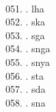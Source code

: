 \begin{tabbing}
\egroup  \\
051.	. 	\> lha 	\> \bgroup\tibetan \def\u#1{\vtop{\baselineskip0pt\hbox{#1}\hbox{\tibsp\char123}}}\parindent=0pt \newbox\fillerbox\setbox\fillerbox\hbox{\vrule height0.4cm depth0.4cm width0pt}\def\filler{\copy\fillerbox}\filler\tibsp{}\tenrm\ \tibetan
\egroup  \\
052.	. 	\> ska 	\> \bgroup\tibetan \def\u#1{\vtop{\baselineskip0pt\hbox{#1}\hbox{\tibsp\char123}}}\parindent=0pt \newbox\fillerbox\setbox\fillerbox\hbox{\vrule height0.4cm depth0.4cm width0pt}\def\filler{\copy\fillerbox}\filler\tibsp{}\tenrm\ \tibetan
\egroup  \\
053.	. 	\> sga 	\> \bgroup\tibetan \def\u#1{\vtop{\baselineskip0pt\hbox{#1}\hbox{\tibsp\char123}}}\parindent=0pt \newbox\fillerbox\setbox\fillerbox\hbox{\vrule height0.4cm depth0.4cm width0pt}\def\filler{\copy\fillerbox}\filler\tibsp{}\tenrm\ \tibetan
\egroup  \\
054.	. 	\> snga 	\> \bgroup\tibetan \def\u#1{\vtop{\baselineskip0pt\hbox{#1}\hbox{\tibsp\char123}}}\parindent=0pt \newbox\fillerbox\setbox\fillerbox\hbox{\vrule height0.4cm depth0.4cm width0pt}\def\filler{\copy\fillerbox}\filler\tibsp{}\tenrm\ \tibetan
\egroup  \\
055.	. 	\> snya 	\> \bgroup\tibetan \def\u#1{\vtop{\baselineskip0pt\hbox{#1}\hbox{\tibsp\char123}}}\parindent=0pt \newbox\fillerbox\setbox\fillerbox\hbox{\vrule height0.4cm depth0.4cm width0pt}\def\filler{\copy\fillerbox}\filler\tibsp{}\tenrm\ \tibetan
\egroup  \\
056.	. 	\> sta 	\> \bgroup\tibetan \def\u#1{\vtop{\baselineskip0pt\hbox{#1}\hbox{\tibsp\char123}}}\parindent=0pt \newbox\fillerbox\setbox\fillerbox\hbox{\vrule height0.4cm depth0.4cm width0pt}\def\filler{\copy\fillerbox}\filler\tibsp{}\tenrm\ \tibetan
\egroup  \\
057.	. 	\> sda 	\> \bgroup\tibetan \def\u#1{\vtop{\baselineskip0pt\hbox{#1}\hbox{\tibsp\char123}}}\parindent=0pt \newbox\fillerbox\setbox\fillerbox\hbox{\vrule height0.4cm depth0.4cm width0pt}\def\filler{\copy\fillerbox}\filler\tibsp{}\tenrm\ \tibetan
\egroup  \\
058.	. 	\> sna 	\> \bgroup\tibetan \def\u#1{\vtop{\baselineskip0pt\hbox{#1}\hbox{\tibsp\char123}}}\parindent=0pt \newbox\fillerbox\setbox\fillerbox\hbox{\vrule height0.4cm depth0.4cm width0pt}\def\filler{\copy\fillerbox}\filler\tibsp{}\tenrm\ \tibetan

\end{tabbing}

